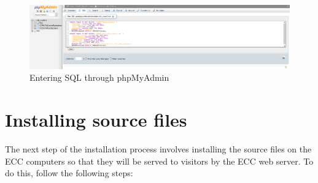 \documentclass{article}
\begin{document}
\begin{figure}[h]
\includegraphics[width=15cm]{sql}
\centering
\caption{Entering SQL through phpMyAdmin}
\label{fig:sql}
\end{figure}

\section{Installing source files}
\par The next step of the installation process involves installing the source
files on the ECC computers so that they will be served to visitors by the ECC
web server.  To do this, follow the following steps:
\end{document}
